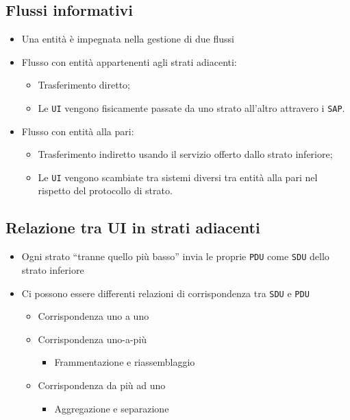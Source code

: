 \subsection{Flussi informativi}
\label{sec:flusinfo}

\begin{itemize}
\item Una entità è impegnata nella gestione di due flussi
\item Flusso con entità appartenenti agli strati adiacenti:
  \begin{itemize}
  \item Trasferimento diretto;
  \item Le \texttt{UI} vengono fisicamente passate da uno strato all'altro attravero i \texttt{SAP}.
  \end{itemize}
\item Flusso con entità alla pari:
  \begin{itemize}
  \item Trasferimento indiretto usando il servizio offerto dallo strato inferiore;
  \item Le \texttt{UI} vengono scambiate tra sistemi diversi tra entità alla pari nel rispetto del protocollo
    di strato.
  \end{itemize}
\end{itemize}

\subsection{Relazione tra UI in strati adiacenti}
\label{sec:reltrauiinstratiadia}
\begin{itemize}
\item Ogni strato ``tranne quello più basso'' invia le proprie \texttt{PDU} come \texttt{SDU} dello strato inferiore
\item Ci possono essere differenti relazioni di corrispondenza tra \texttt{SDU} e \texttt{PDU}
  \begin{itemize}
  \item Corrispondenza uno a uno
    \begin{center}
      
    \end{center}
  \item Corrispondenza uno-a-più
    \begin{center}
      
    \end{center}
    \begin{itemize}
    \item Frammentazione e riassemblaggio
    \end{itemize}
  \item Corrispondenza da più ad uno
    \begin{center}
      
    \end{center}   
    \begin{itemize}
    \item Aggregazione e separazione
    \end{itemize}
  \end{itemize}
\end{itemize}
\clearpage

